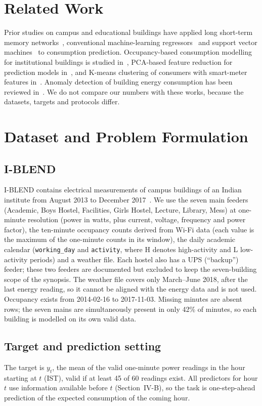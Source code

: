 \documentclass[conference]{IEEEtran}
\begin{document}
\section{Related Work}
Prior studies on campus and educational buildings have applied long short-term memory networks~\cite{faiq2023lstm}, conventional machine-learning regressors~\cite{elhabyb2024ml} and
support vector machines~\cite{liu2020svm} to consumption prediction. Occupancy-based consumption modelling for institutional buildings is studied in~\cite{anand2021occupancy},
PCA-based feature reduction for prediction models in~\cite{parhizkar2021pca}, and K-means clustering of consumers with smart-meter features in~\cite{okereke2023kmeans}.
Anomaly detection of building energy consumption has been reviewed in~\cite{himeur2021anomaly}. We do not compare our numbers with these works, because the datasets, targets and protocols differ.

\section{Dataset and Problem Formulation}
\subsection{I-BLEND}
I-BLEND contains electrical measurements of campus buildings of an Indian institute from August 2013 to December 2017~\cite{rashid2019iblend}. We use the seven main
feeders (Academic, Boys Hostel, Facilities, Girls Hostel, Lecture, Library, Mess) at one-minute resolution (power in watts, plus current, voltage, frequency and power factor),
the ten-minute occupancy counts derived from Wi-Fi data (each value is the maximum of the one-minute counts in its window), the daily academic calendar
(\texttt{working\_day} and \texttt{activity}, where H denotes high-activity and L low-activity periods) and a weather file. Each hostel also has a UPS (``backup'') feeder;
these two feeders are documented but excluded to keep the seven-building scope of the synopsis. The weather file covers only March--June 2018, after the last energy reading, so it cannot be aligned with the energy data and is not used.
Occupancy exists from 2014-02-16 to 2017-11-03. Missing minutes are absent rows; the seven mains are simultaneously present in only 42\% of minutes, so each building is modelled on its own valid data.

\subsection{Target and prediction setting}
The target is $y_t$, the mean of the valid one-minute power readings in the hour starting at $t$ (IST), valid if at least 45 of 60 readings exist. All predictors for hour $t$
use information available before $t$ (Section~IV-B), so the task is one-step-ahead prediction of the expected consumption of the coming hour.
\end{document}
